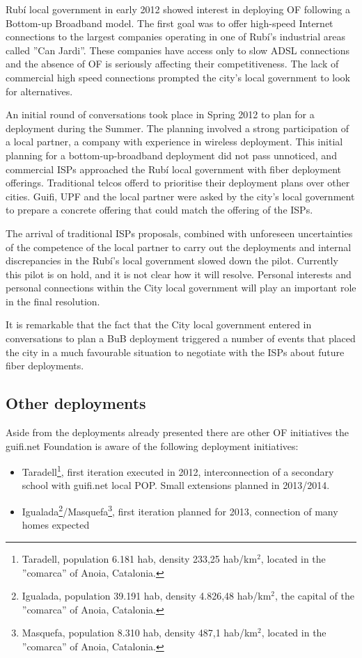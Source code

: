 Rub\'{i} local government in early 2012 showed interest in deploying OF following a Bottom-up Broadband model.
The first goal was to offer high-speed Internet connections to the largest companies operating in one of Rub\'{i}'s industrial areas called ''Can Jardi''.
These companies have access only to slow ADSL connections and the absence of OF is seriously affecting their competitiveness.
The lack of commercial high speed connections prompted the city's local government to look for alternatives.

An initial round of conversations took place in Spring 2012 to plan for a deployment during the Summer.
The planning involved a strong participation of a local partner, a company with experience in wireless deployment.
This initial planning for a bottom-up-broadband deployment did not pass unnoticed, and commercial ISPs approached the Rub\'{i} local government with fiber deployment offerings.
Traditional telcos offerd to prioritise their deployment plans over other cities.
Guifi, UPF and the local partner were asked by the city's local government to prepare a concrete offering that could match the offering of the ISPs.

The arrival of traditional ISPs proposals, combined with unforeseen uncertainties of the competence of the local partner to carry out the deployments and internal discrepancies in the Rub\'{i}'s local government slowed down the pilot.
Currently this pilot is on hold, and it is not clear how it will resolve.
Personal interests and personal connections within the City local government will play an important role in the final resolution.

It is remarkable that the fact that the City local government entered in conversations to plan a BuB deployment triggered a number of events that placed the city in a much favourable situation to negotiate with the ISPs about future fiber deployments.


\FloatBarrier
\subsection{Other deployments}

Aside from the deployments already presented there are other OF initiatives the guifi.net Foundation is aware of the following deployment initiatives:

\begin{itemize}
  \item Taradell\footnote{Taradell, population 6.181 hab, density 233,25 hab/km$^{2}$, located in the ''comarca'' of Anoia, Catalonia.}, first iteration executed in 2012, interconnection of a secondary school with guifi.net local POP. Small extensions planned in 2013/2014.
  \item Igualada\footnote{Igualada, population 39.191 hab, density 4.826,48 hab/km$^{2}$, the capital of the ''comarca'' of Anoia, Catalonia.}/Masquefa\footnote{Masquefa, population 8.310 hab, density 487,1 hab/km$^{2}$, located in the ''comarca'' of Anoia, Catalonia.}, first iteration planned for 2013, connection of many homes expected
\end{itemize}

